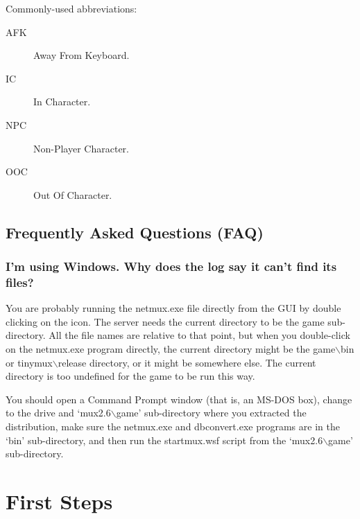 \documentclass[10pt,letterpaper]{book}
\begin{document}
Commonly-used abbreviations:

\begin{description}
\item[AFK] Away From Keyboard.

\item[IC] In Character.

\item[NPC] Non-Player Character.

\item[OOC] Out Of Character.

\end{description}
\section{Frequently Asked Questions (FAQ)}
\subsection{I'm using Windows. Why does the log say it can't find its files?}
You are probably running the netmux.exe file directly from the GUI by double
clicking on the icon. The server needs the current directory to be the game
sub-directory. All the file names are relative to that point, but when you
double-click on the netmux.exe program directly, the current directory might
be the game$\backslash$bin or tinymux$\backslash$release directory, or it
might be somewhere else.  The current directory is too undefined for the game
to be run this way.

You should open a Command Prompt window (that is, an MS-DOS box), change to
the drive and `mux2.6$\backslash$game' sub-directory where you extracted the
distribution, make sure the netmux.exe and dbconvert.exe
programs are in the `bin' sub-directory, and then run the startmux.wsf
script from the `mux2.6$\backslash$game' sub-directory.

\chapter{First Steps}
\end{document}
